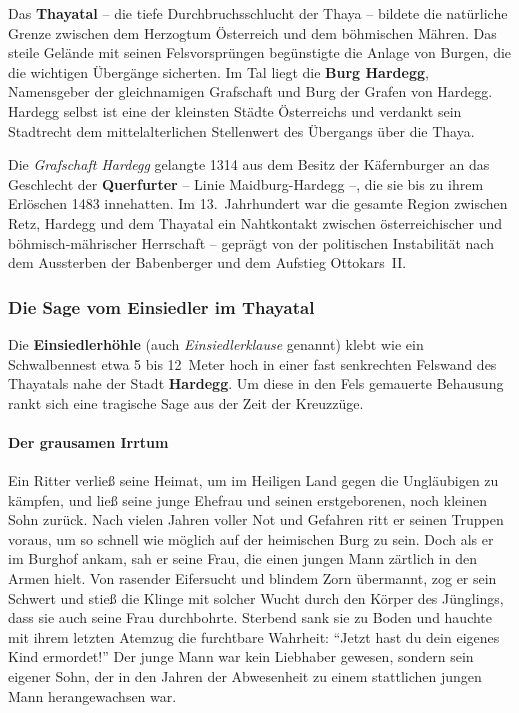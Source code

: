 Das \textbf{Thayatal} -- die tiefe Durchbruchsschlucht der Thaya -- bildete die natürliche Grenze zwischen dem Herzogtum Österreich und dem böhmischen Mähren. Das steile Gelände mit seinen Felsvorsprüngen begünstigte die Anlage von Burgen, die die wichtigen Übergänge sicherten. Im Tal liegt die \textbf{Burg Hardegg}, Namensgeber der gleichnamigen Grafschaft und Burg der Grafen von Hardegg. Hardegg selbst ist eine der kleinsten Städte Österreichs und verdankt sein Stadtrecht dem mittelalterlichen Stellenwert des Übergangs über die Thaya. \cite{kacetl_thayatal,stenzel_burg_zu_burg}

Die \textit{Grafschaft Hardegg} gelangte 1314 aus dem Besitz der Käfernburger an das Geschlecht der \textbf{Querfurter} -- Linie Maidburg-Hardegg --, die sie bis zu ihrem Erlöschen 1483 innehatten. Im 13.~Jahrhundert war die gesamte Region zwischen Retz, Hardegg und dem Thayatal ein Nahtkontakt zwischen österreichischer und böhmisch-mährischer Herrschaft -- geprägt von der politischen Instabilität nach dem Aussterben der Babenberger und dem Aufstieg Ottokars~II. \cite{kacetl_thayatal,niederstaetter_oesterreich}

\subsubsection{Die Sage vom Einsiedler im Thayatal}\label{sage_von_einsielder}

Die \textbf{Einsiedlerhöhle} (auch \textit{Einsiedlerklause} genannt) klebt wie ein Schwalbennest etwa 5 bis 12~Meter hoch in einer fast senkrechten Felswand des Thayatals nahe der Stadt \textbf{Hardegg}. Um diese in den Fels gemauerte Behausung rankt sich eine tragische Sage aus der Zeit der Kreuzzüge. \cite{sagen_thayatal,kacetl_thayatal}

\paragraph*{Der grausamen Irrtum}

Ein Ritter verließ seine Heimat, um im Heiligen Land gegen die Ungläubigen zu kämpfen, und ließ seine junge Ehefrau und seinen erstgeborenen, noch kleinen Sohn zurück. Nach vielen Jahren voller Not und Gefahren ritt er seinen Truppen voraus, um so schnell wie möglich auf der heimischen Burg zu sein. Doch als er im Burghof ankam, sah er seine Frau, die einen jungen Mann zärtlich in den Armen hielt. Von rasender Eifersucht und blindem Zorn übermannt, zog er sein Schwert und stieß die Klinge mit solcher Wucht durch den Körper des Jünglings, dass sie auch seine Frau durchbohrte. Sterbend sank sie zu Boden und hauchte mit ihrem letzten Atemzug die furchtbare Wahrheit: \enquote{Jetzt hast du dein eigenes Kind ermordet!} Der junge Mann war kein Liebhaber gewesen, sondern sein eigener Sohn, der in den Jahren der Abwesenheit zu einem stattlichen jungen Mann herangewachsen war.

